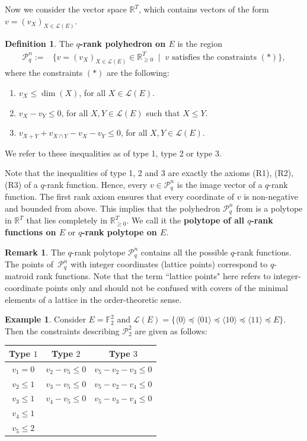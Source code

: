 \documentclass[a4paper,11pt,reqno]{amsart}
\theoremstyle{definition}
\newtheorem{definition}[theorem]{{{Definition}}}
\newtheorem{example}[theorem]{{{Example}}}
\newtheorem{remark}[theorem]{{{Remark}}}
\newcommand{\mL}{\mathcal{L}}
\newcommand{\mP}{\mathcal{P}}
\newcommand{\F}{\mathbb F}
\newcommand{\la}{\langle}
\newcommand{\ra}{\rangle}
\begin{document}
{Now we consider the vector space $\mathbb{R}^T$, which contains vectors of the form $v=(v_X)_{X\in\mL(E)}$. 

\begin{definition}\label{def:rank_poly}
The \textbf{$q$-rank polyhedron on $E$} is the region
\begin{align*}
    \mathcal{P}_q^n:=&\{v=(v_X)_{X\in\mL(E)}\in\mathbb{R}_{\geq 0}^T\;\mid\; v \text{ satisfies the constraints } (*)\},
\end{align*}
where the constraints $(*)$ are the following:
\begin{enumerate}
    \item $v_X \leq \dim(X)$, for all $X\in\mL(E)$.
    \item $v_X-v_Y \leq 0$, for all $X,Y\in\mL(E)$ such that $X\leq Y$.
    \item $v_{X+Y}+v_{X\cap Y}-v_{X}-v_{Y} \leq 0$, for all $X,Y\in\mL(E)$.
 \end{enumerate}
We refer to these inequalities as of type 1, type 2 or type 3. 
\end{definition}
Note that the inequalities of type 1, 2 and 3 are exactly the axioms (R1), (R2), (R3) of a $q$-rank function. 
Hence, every $v\in\mP_q^n$ is the image vector of a $q$-rank function.
The first rank axiom ensures that every coordinate of $v$ is non-negative and bounded from above. This implies that the polyhedron $\mathcal{P}_q^n$  from   is a polytope  in $\mathbb{R}^T$ that lies completely in $\mathbb{R}_{\geq 0}^T$. We call it the \textbf{polytope of all $q$-rank functions on $E$} or \textbf{$q$-rank polytope on $E$}. 


\begin{remark}
The $q$-rank polytope $\mathcal{P}_q^n$ contains all the possible $q$-rank functions. The points of~$\mathcal{P}_q^n$ with integer coordinates (lattice points) correspond to $q$-matroid rank functions. Note that the term ``lattice points" here refers to integer-coordinate points only and should not be confused with covers of the minimal elements of a lattice in the order-theoretic sense.
\end{remark}

\begin{example}\label{ex:first_ex}
Consider $E=\F_2^2$ and $\mL(E)=\{\la 0 \ra \preceq \la 0 1\ra \preceq \la 1 0\ra \preceq \la 1 1\ra \preceq E\}$. Then the constraints describing $\mathcal{P}_2^2$ are given as follows:
    
\begin{center}
    \begin{tabular}{c|c|c}
        \textbf{Type $1$} & \textbf{Type $2$} & \textbf{Type $3$}\\ \hline
             $v_1=0$ & $v_2-v_5 \leq 0$  & $v_5-v_2-v_3 \leq 0$ \\
             $v_2 \leq 1$ & $v_3-v_5 \leq 0$ & $v_5-v_2-v_4 \leq 0$ \\
             $v_3 \leq 1$ & $v_4-v_5 \leq 0$ & $v_5-v_3-v_4 \leq 0$ \\
             $v_4 \leq 1$ &  & \\
             $v_5\leq 2$ &  &
    \end{tabular}
\end{center}


\end{example}}
\end{document}
